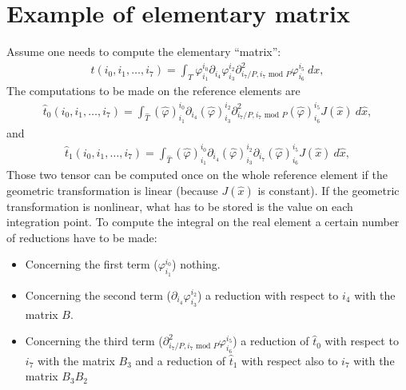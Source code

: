 \documentclass[a4paper,11pt,english]{sphinxmanual}
\begin{document}
\section{Example of elementary matrix}
\label{\detokenize{project/appendixA:example-of-elementary-matrix}}
Assume one needs to compute the elementary “matrix”:
\begin{equation*}
\begin{split}t(i_0, i_1, \ldots, i_7) =
\int_{T}\varphi_{i_1}^{i_0}
\partial_{i_4}\varphi_{i_3}^{i_2}
\partial^2_{i_7/ P, i_7\mbox{ mod } P}\varphi_{i_6}^{i_5}\ dx,\end{split}
\end{equation*}
The computations to be made on the reference elements are
\begin{equation*}
\begin{split}\widehat{t}_0(i_0, i_1, \ldots,i_7) =
\int_{\widehat{T}}(\widehat{\varphi})_{i_1}^{i_0}
\partial_{i_4}(\widehat{\varphi})_{i_3}^{i_2}
\partial^2_{i_7 / P, i_7\mbox{ mod } P}(\widehat{\varphi})_{i_6}^{i_5} J(\widehat{x})\ d\widehat{x},\end{split}
\end{equation*}
and
\begin{equation*}
\begin{split}\widehat{t}_1(i_0, i_1, \ldots, i_7) =
\int_{\widehat{T}}(\widehat{\varphi})_{i_1}^{i_0}
\partial_{i_4}(\widehat{\varphi})_{i_3}^{i_2}
\partial_{i_7}(\widehat{\varphi})_{i_6}^{i_5} J(\widehat{x})\ d\widehat{x},\end{split}
\end{equation*}
Those two tensor can be computed once on the whole reference element if the
geometric transformation is linear (because \(J(\widehat{x})\) is constant). If the
geometric transformation is non\sphinxhyphen{}linear, what has to be stored is the value on
each integration point. To compute the integral on the real element a certain
number of reductions have to be made:
\begin{itemize}
\item {} 
Concerning the first term (\(\varphi_{i_1}^{i_0}\)) nothing.

\item {} 
Concerning the second term (\(\partial_{i_4}\varphi_{i_3}^{i_2}\)) a
reduction with respect to \(i_4\) with the matrix \(B\).

\item {} 
Concerning the third term (\(\partial^2_{i_7 / P, i_7\mbox{ mod }P}
\varphi_{i_6}^{i_5}\)) a reduction of \(\widehat{t}_0\) with respect to \(i_7\)
with the matrix \(B_3\) and a reduction of \(\widehat{t}_1\) with respect also
to \(i_7\) with the matrix \(B_3 B_2\)

\end{itemize}
\end{document}
